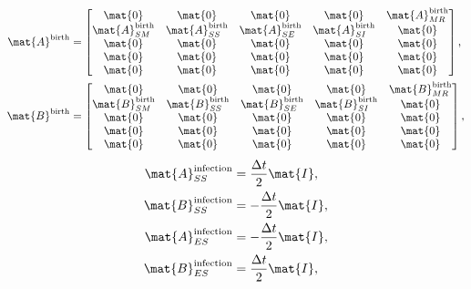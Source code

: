 \documentclass{jpmarticle}
\begin{document}
\begin{equation}
  \begin{split}
    \mat{A}^{\text{birth}} &=
    \begin{bmatrix}
      \mat{0} & \mat{0} & \mat{0} & \mat{0} & \mat{A}_{MR}^{\text{birth}}
      \\
      \mat{A}_{SM}^{\text{birth}} & \mat{A}_{SS}^{\text{birth}} &
      \mat{A}_{SE}^{\text{birth}} & \mat{A}_{SI}^{\text{birth}} & \mat{0}
      \\
      \mat{0} & \mat{0} & \mat{0} & \mat{0} & \mat{0}
      \\
      \mat{0} & \mat{0} & \mat{0} & \mat{0} & \mat{0}
      \\
      \mat{0} & \mat{0} & \mat{0} & \mat{0} & \mat{0}
    \end{bmatrix},
    \\
    \mat{B}^{\text{birth}} &=
    \begin{bmatrix}
      \mat{0} & \mat{0} & \mat{0} & \mat{0} & \mat{B}_{MR}^{\text{birth}}
      \\
      \mat{B}_{SM}^{\text{birth}} & \mat{B}_{SS}^{\text{birth}} &
      \mat{B}_{SE}^{\text{birth}} & \mat{B}_{SI}^{\text{birth}} & \mat{0}
      \\
      \mat{0} & \mat{0} & \mat{0} & \mat{0} & \mat{0}
      \\
      \mat{0} & \mat{0} & \mat{0} & \mat{0} & \mat{0}
      \\
      \mat{0} & \mat{0} & \mat{0} & \mat{0} & \mat{0}
    \end{bmatrix},
  \end{split}
\end{equation}
\begin{equation}
  \begin{split}
    \mat{A}_{SS}^{\text{infection}} &=
    \frac{\Delta t}{2} \mat{I},
    \\
    \mat{B}_{SS}^{\text{infection}} &=
    - \frac{\Delta t}{2} \mat{I},
    \\
    \mat{A}_{ES}^{\text{infection}} &=
    - \frac{\Delta t}{2} \mat{I},
    \\
    \mat{B}_{ES}^{\text{infection}} &=
    \frac{\Delta t}{2} \mat{I},
  \end{split}
\end{equation}
\end{document}
